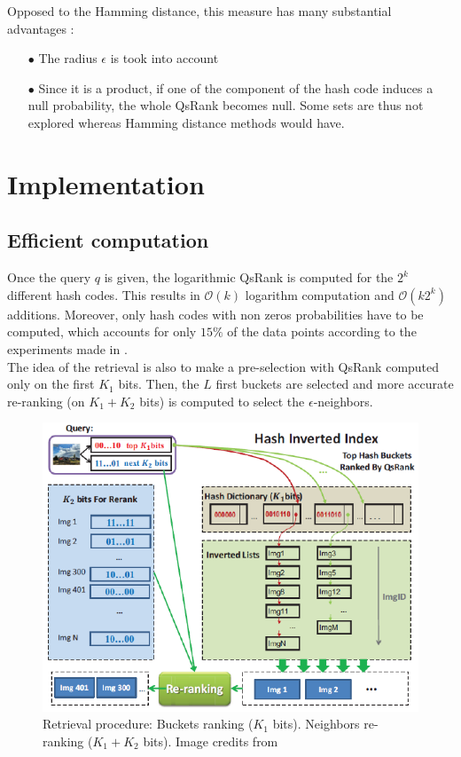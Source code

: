 \documentclass{article}
\begin{document}
Opposed to the Hamming distance, this measure has many substantial advantages :
\begin{enumerate}
	\item[$\bullet$] The radius $\epsilon$ is took into account	
	\item[$\bullet$] Since it is a product, if one of the component of the hash code induces a null probability, the whole QsRank becomes null. Some sets are thus not explored whereas Hamming distance methods would have.
\end{enumerate}

\section{Implementation}

\subsection{Efficient computation}

Once the query $q$ is given, the logarithmic QsRank is computed for the $2^k$ different hash codes. This results in $\mathcal{O}(k)$ logarithm computation and $\mathcal{O}(k 2^k)$ additions. Moreover, only hash codes with non zeros probabilities have to be computed, which accounts for only $15\%$ of the data points according to the experiments made in \citep{QSRank}.\\
The idea of the retrieval is also to make a pre-selection with QsRank computed only on the first $K_1$ bits. Then, the $L$ first buckets are selected and more accurate re-ranking (on $K_1+K_2$ bits) is computed to select the $\epsilon$-neighbors.

\begin{figure}[htbp]
	\begin{center}
	\includegraphics[width=.6\linewidth]{Images/algo.png}
	\caption{Retrieval procedure: Buckets ranking ($K_1$ bits). Neighbors re-ranking ($K_1+K_2$ bits). Image credits from \citep{QSRank}}
	\end{center}
	\label{fig:algo}
\end{figure}
\end{document}
